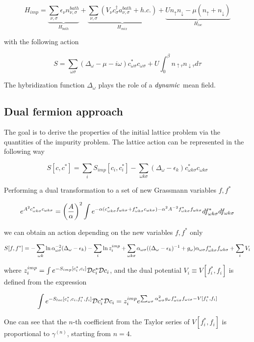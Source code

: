 \[ H_{imp} = \underbrace{\sum_{\nu,\sigma}\epsilon_\nu n_{\nu,\sigma}^{bath}}_{H_{bath}} + 
	     \underbrace{\sum_{\nu,\sigma}\left(V_{\nu}c_{\sigma}^{\dagger}a_{\nu,\sigma}^{bath}+h.c.\right)}_{H_{mix}}+
	     \underbrace{U n_{\uparrow} n_{\downarrow}-\mu \left(n_{\uparrow}+n_{\downarrow}\right)}_{H_{loc}}
\]

with the following action

\[ S = \sum_{\omega \sigma}(\Delta_\omega-\mu-i\omega)c_{\omega\sigma}^* c_{\omega\sigma} + U\int_0^\beta n_{\uparrow\tau}n_{\downarrow\tau} d\tau \]

The hybridization function $\Delta_\omega$ plays the role of a $\it{dynamic}$ mean field.

\subsection{Dual fermion approach}
The goal is to derive the properties of the initial lattice problem via the quantities
of the impurity problem.
The lattice action can be represented in the following way

\[ S[c,c^*] = \sum_i S_{imp}[c_i,c_i^*] - \sum_{\omega k \sigma}(\Delta_\omega-\epsilon_k)c_{\omega k\sigma}^* c_{\omega k\sigma} \]

Performing a dual transformation to a set of new Grassmann variables $f,f^*$

\[ e^{A^2 c_{\omega k\sigma}^*c_{\omega k\sigma}} = \left(\frac{A}{\alpha}\right)^2 \int 
    e^{-\alpha(c_{\omega k\sigma}^*f_{\omega k\sigma}+f_{\omega k\sigma}^*c_{\omega k\sigma})-\alpha^2 A^{-2}f_{\omega k\sigma}^*f_{\omega k\sigma}}df_{\omega k\sigma}^*df_{\omega k\sigma}
 \]

we can obtain an action depending on the new variables $f,f^*$ only

\[ S[f,f^*] = -\sum_{\omega k} \ln{\alpha_{\omega\sigma}^{-2}(\Delta_\omega-\epsilon_k)} 
    - \sum_i\ln{z_i^{imp}} + \sum_{\omega k\sigma} \alpha_{\omega\sigma}((\Delta_\omega-\epsilon_k)^{-1}+g_\omega)
    \alpha_{\omega\sigma}f_{\omega k\sigma}^*f_{\omega k\sigma}+\sum_i V_i
\]

where $z_i^{imp} = \int e^{-S_{imp}[c_i^*,c_i]}\mathcal{D} c_i^*\mathcal{D} c_i$, and the dual potential $V_i \equiv V[f_i^*,f_i]$
is defined from the expression

\[ \int e^{-S_{loc}[c_i^*,c_i,f_i^*,f_i]}\mathcal{D} c_i^*\mathcal{D} c_i = 
  z_i^{imp}e^{\sum_{\omega\sigma}\alpha_{\omega\sigma}^2g_\omega f_{\omega i \sigma}^*f_{\omega i \sigma} - V[f_i^*,f_i]} \]

One can see that the $n$-th coefficient from the Taylor series of 
$V[f_i^*,f_i]$ is proportional to $\gamma^{(n)}$, starting from $n=4$.